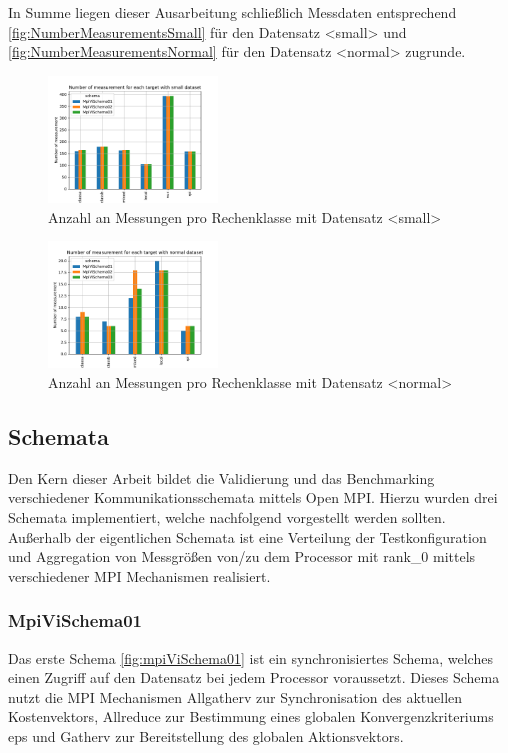 In Summe liegen dieser Ausarbeitung schließlich Messdaten entsprechend \autoref{fig:NumberMeasurementsSmall} für den Datensatz <small> und \autoref{fig:NumberMeasurementsNormal} für den Datensatz <normal> zugrunde.

\begin{figure}[h]
    \centering
    \includegraphics[width=0.4\textwidth]{./gen/img/ds/small/number_measurement_target.pdf}
    \caption{Anzahl an Messungen pro Rechenklasse mit Datensatz <small>}
    \label{fig:NumberMeasurementsSmall}
\end{figure}

\begin{figure}[h]
    \centering
    \includegraphics[width=0.4\textwidth]{./gen/img/ds/normal/number_measurement_target.pdf}
    \caption{Anzahl an Messungen pro Rechenklasse mit Datensatz <normal>}
    \label{fig:NumberMeasurementsNormal}
\end{figure}

\subsection{Schemata}
\label{ssec:schemata}

Den Kern dieser Arbeit bildet die Validierung und das Benchmarking verschiedener Kommunikationsschemata mittels Open MPI. Hierzu wurden drei Schemata implementiert, welche nachfolgend vorgestellt werden sollten. Außerhalb der eigentlichen Schemata ist eine Verteilung der Testkonfiguration und Aggregation von Messgrößen von/zu dem Processor mit rank\_0 mittels verschiedener MPI Mechanismen realisiert.

\subsubsection{MpiViSchema01}
Das erste Schema \autoref{fig:mpiViSchema01} ist ein synchronisiertes Schema, welches einen Zugriff auf den Datensatz bei jedem Processor voraussetzt. Dieses Schema nutzt die MPI Mechanismen Allgatherv zur Synchronisation des aktuellen Kostenvektors, Allreduce zur Bestimmung eines globalen Konvergenzkriteriums eps und Gatherv zur Bereitstellung des globalen Aktionsvektors.

